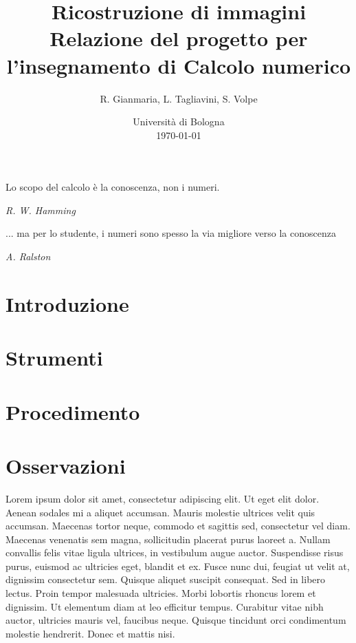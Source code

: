 \documentclass[a4paper]{article}
\title{Ricostruzione di immagini \\ \large Relazione del progetto per l'insegnamento di Calcolo numerico}
\author{
  R. Gianmaria,
  L. Tagliavini,
  S. Volpe
}
\date{
	Universit\`a di Bologna \\
  \today
}
\begin{document}
\maketitle
\thispagestyle{empty}

\epigraph{Lo scopo del calcolo è la conoscenza, non i numeri.}
{\textit{R. W. Hamming}}
\epigraph{... ma per lo studente, i numeri sono spesso la via migliore verso la
conoscenza}
{\textit{A. Ralston}}

\section{Introduzione}

\section{Strumenti}

\section{Procedimento}

\section{Osservazioni}


Lorem ipsum dolor sit amet, consectetur adipiscing elit. Ut eget elit dolor. Aenean sodales mi a aliquet accumsan. Mauris molestie ultrices velit quis accumsan. Maecenas tortor neque, commodo et sagittis sed, consectetur vel diam. Maecenas venenatis sem magna, sollicitudin placerat purus laoreet a. Nullam convallis felis vitae ligula ultrices, in vestibulum augue auctor. Suspendisse risus purus, euismod ac ultricies eget, blandit et ex. Fusce nunc dui, feugiat ut velit at, dignissim consectetur sem. Quisque aliquet suscipit consequat. Sed in libero lectus. Proin tempor malesuada ultricies. Morbi lobortis rhoncus lorem et dignissim. Ut elementum diam at leo efficitur tempus. Curabitur vitae nibh auctor, ultricies mauris vel, faucibus neque. Quisque tincidunt orci condimentum molestie hendrerit. Donec et mattis nisi.
\end{document}
